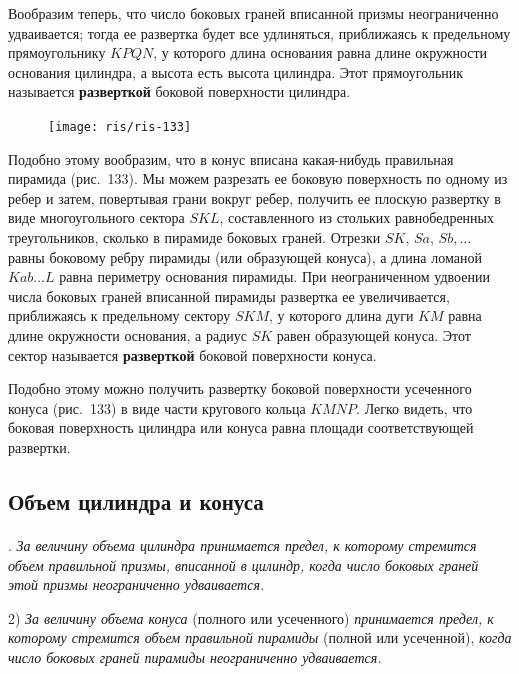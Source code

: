 \documentclass[twoside]{book}
\begin{document}
Вообразим теперь, что число боковых граней вписанной призмы неограниченно удваивается;
тогда ее развертка будет все удлиняться, приближаясь к предельному прямоугольнику $KPQN$, у которого длина основания равна длине окружности основания цилиндра, а высота есть высота цилиндра.
Этот прямоугольник называется \textbf{разверткой} боковой поверхности цилиндра.

\begin{figure}[h!]
\centering
\texttt{[image: ris/ris-133]}
\caption{}
\end{figure}

Подобно этому вообразим, что в конус вписана какая-нибудь правильная пирамида (рис.~133).
Мы можем разрезать ее боковую поверхность по одному из ребер и затем, повертывая грани вокруг ребер, получить ее плоскую развертку в виде многоугольного сектора $SKL$, составленного из стольких равнобедренных треугольников, сколько в пирамиде боковых граней.
Отрезки $SK$, $Sa$, $Sb,\dots$ равны боковому ребру пирамиды (или образующей конуса), а длина ломаной $Kab\dots L$ равна периметру основания пирамиды.
При неограниченном удвоении числа боковых граней вписанной пирамиды развертка ее увеличивается, приближаясь к предельному сектору $SKM$, у которого длина дуги $KM$ равна длине окружности основания, а радиус $SK$ равен образующей конуса.
Этот сектор называется \textbf{разверткой} боковой поверхности конуса.

Подобно этому можно получить развертку боковой поверхности усеченного конуса (рис.~133) в виде части кругового кольца $KMNP$.
Легко видеть, что боковая поверхность цилиндра или конуса равна площади соответствующей развертки.

\subsection*{Объем цилиндра и конуса}

\paragraph{}\label{1938/s119}
.
\emph{За величину объема цилиндра принимается предел, к которому стремится объем правильной призмы, вписанной в цилиндр, когда число боковых граней этой призмы неограниченно удваивается.}

2) \emph{За величину объема конуса} (полного или усеченного) \emph{принимается предел, к которому стремится объем правильной пирамиды} (полной или усеченной), \emph{когда число боковых граней пирамиды неограниченно удваивается.}
\end{document}
